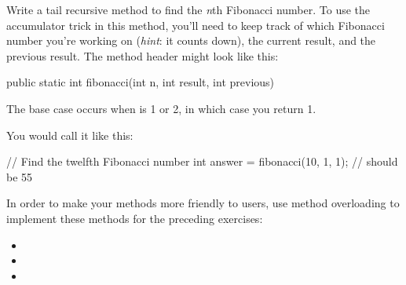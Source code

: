 \begin{exercise}
Write a tail recursive method to find the {\em n}th Fibonacci number. To use the accumulator trick in this method, you'll need to keep track of which Fibonacci number you're working on ({\em hint}: it counts down), the current result, and the previous result. The method header might look like this:

\begin{code}
public static int fibonacci(int n, int result, int previous)
\end{code}

The base case occurs when  is 1 or 2, in which case you return 1.

You would call it like this:

\begin{code}
// Find the twelfth Fibonacci number
int answer = fibonacci(10, 1, 1); // should be 55
\end{code}

\end{exercise}

\begin{exercise}
In order to make your methods more friendly to users, use method overloading to implement these methods for the preceding exercises:

\begin{itemize}
\item {}
\item {}
\item {}
\end{itemize}
\end{exercise}
